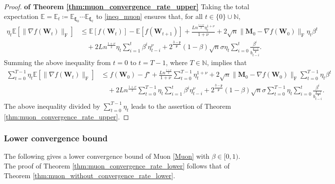 \documentclass[twoside,11pt]{article}
\begin{document}
\begin{proof}
\textbf{of Theorem \ref{thm:muon_convergence_rate_upper}} Taking the total expectation $\mathbb{E} = \mathbb{E}_t \coloneqq \mathbb{E}_{\bm{\xi}_0} \cdots \mathbb{E}_{\bm{\xi}_t}$ to \eqref{ineq_muon} ensures that, for all $t \in \{ 0\} \cup \mathbb{N}$,
\begin{align*}
\eta_t 
\mathbb{E} [\| \nabla f (\bm{W}_t) \|_{\mathrm{F}}]
&\leq 
\mathbb{E} [ f(\bm{W}_{t})]
-
\mathbb{E} [ f(\bm{W}_{t+1})]
+
\frac{L n^{\frac{1 + \nu}{2}} \eta_t^{1 + \nu}}{1 + \nu}
+ 2 \sqrt{n} \| \bm{M}_{0} - \nabla f(\bm{W}_{0}) \|_{\mathrm{F}} \eta_t \beta^t\\
&\quad + 2 L n^{\frac{1+\nu}{2}} \eta_t \sum_{i=1}^t \beta^i \eta_{t-i}^\nu
+ 2^{\frac{3 - \mathfrak{p}}{\mathfrak{p}}} (1 - \beta) \sqrt{n} \sigma \eta_t \sum_{i=0}^t 
\frac{\beta^i}{b_{t-i}^{\frac{\mathfrak{p} -1}{\mathfrak{p}}}}.
\end{align*}
Summing the above inequality from $t = 0$ to $t = T-1$, where $T \in \mathbb{N}$, implies that
\begin{align*}
\sum_{t=0}^{T-1} \eta_t 
\mathbb{E} [\| \nabla f (\bm{W}_t) \|_{\mathrm{F}}]
&\leq 
f(\bm{W}_{0}) - f^\star
+
\frac{L n^{\frac{1 + \nu}{2}}}{1 + \nu}
\sum_{t=0}^{T-1} \eta_t^{1 + \nu}
+ 2 \sqrt{n} \| \bm{M}_{0} - \nabla f(\bm{W}_{0}) \|_{\mathrm{F}} \sum_{t=0}^{T-1} \eta_t \beta^t\\
&\quad + 2 L n^{\frac{1+\nu}{2}} \sum_{t=0}^{T-1} \eta_t \sum_{i=1}^t \beta^i \eta_{t-i}^\nu
+ 2^{\frac{3 - \mathfrak{p}}{\mathfrak{p}}} (1 - \beta) \sqrt{n} \sigma \sum_{t=0}^{T-1} \eta_t \sum_{i=0}^t 
\frac{\beta^i}{b_{t-i}^{\frac{\mathfrak{p} -1}{\mathfrak{p}}}}.
\end{align*}
The above inequality divided by $\sum_{t=0}^{T-1} \eta_t$ leads to the assertion of Theorem \ref{thm:muon_convergence_rate_upper}.
\end{proof}

\subsubsection{Lower convergence bound}
The following gives a lower convergence bound of Muon \eqref{Muon} with $\beta \in [0,1)$. The proof of Theorem \ref{thm:muon_convergence_rate_lower} follows that of Theorem \ref{thm:muon_without_convergence_rate_lower}.
\end{document}

